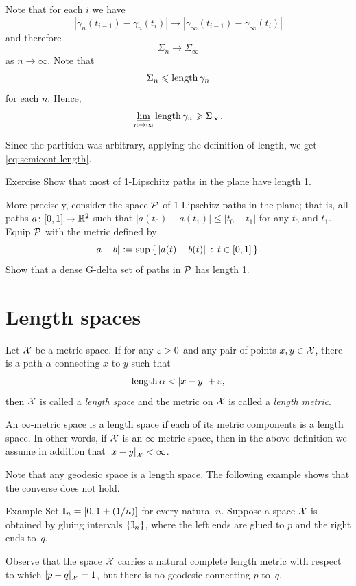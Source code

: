 Note that for each $i$ we have 
\[|\gamma_n(t_{i-1})-\gamma_n(t_i)|\to|\gamma_\infty(t_{i-1})-\gamma_\infty(t_i)|\]
and therefore
\[\Sigma_n\to \Sigma_\infty\] 
as $n\to\infty$.
Note that 
\[\Sigma_n\leqslant\mathop{\rm length}\nolimits\gamma_n\]
for each $n$.
Hence,
$$\varliminf_{n\to\infty} \mathop{\rm length}\nolimits\gamma_n \geqslant \Sigma_\infty.$$

Since the partition was arbitrary, applying the definition of length, we get \ref{eq:semicont-length}.
\qeds

\begin{thm}{Exercise}\label{ex:1-Lip-G-delta}
Show that most of 1-Lipschitz paths in the plane have length 1.

More precisely, consider the space $\mathcal{P}$ of 1-Lipschitz paths in the plane;
that is, all paths $a\colon[0,1]\to\mathbb{R}^2$ such that $|a(t_0)-a(t_1)|\le |t_0-t_1|$ for any $t_0$ and $t_1$.
Equip $\mathcal{P}$ with the metric defined by
\[\dist{a}{b}{}\df\sup\set{\dist{a(t)}{b(t)}{}}{t\in[0,1]}.\]
Show that a dense G-delta set of paths in $\mathcal{P}$ has length 1.

\end{thm}


\section{Length spaces}\label{sec:intrinsic}

Let $\mathcal{X}$ be a metric space.
If for any $\varepsilon>0$ and any pair of points $x,y\in\mathcal{X}$, there is a path $\alpha$ connecting $x$ to $y$ such that
\[\length\alpha< \dist{x}{y}{}+\eps,\]
then $\mathcal{X}$ is called a \emph{length space} and the metric on $\mathcal{X}$ is called a \emph{length metric}.\label{page:length metric}

An $\infty$-metric space is a length space if each of its metric components is a length space.
In other words, if $\mathcal{X}$ is an $\infty$-metric space, then in the above definition we assume in addition that $\dist{x}{y}{\spc{X}}<\infty$.

Note that any geodesic space is a length space.
The following example shows that the converse does not hold.


\begin{thm}{Example}
Set $\mathbb{I}_n=[0,1+(1/n)]$ for every natural $n$.
Suppose a space $\mathcal{X}$ is obtained by gluing intervals $\{\mathbb{I}_n\}$, where the left ends are glued to $p$ and the right ends to~$q$.

Observe that the space $\mathcal{X}$ carries a natural complete length metric with respect to which $\dist{p}{q}{\spc{X}}=1$, but there is no geodesic connecting $p$ to~$q$.
\end{thm}

